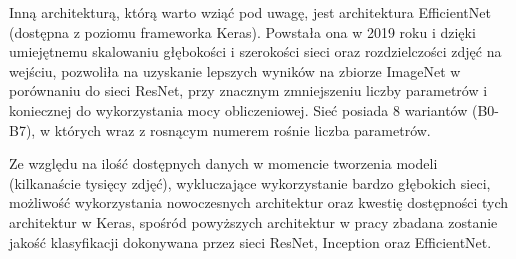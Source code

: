 \documentclass[polish,12pt]{aghthesis}
\begin{document}
\par Inną architekturą, którą warto wziąć pod uwagę, jest architektura EfficientNet (dostępna z poziomu frameworka Keras). Powstała ona w 2019 roku i dzięki umiejętnemu skalowaniu głębokości i szerokości sieci oraz rozdzielczości zdjęć na wejściu, pozwoliła na uzyskanie lepszych wyników na zbiorze ImageNet w porównaniu do sieci ResNet, przy znacznym zmniejszeniu liczby parametrów i koniecznej do wykorzystania mocy obliczeniowej. Sieć posiada 8 wariantów (B0-B7), w których wraz z rosnącym numerem rośnie liczba parametrów.
\par
Ze względu na ilość dostępnych danych w momencie tworzenia modeli (kilkanaście tysięcy zdjęć), wykluczające wykorzystanie bardzo głębokich sieci, możliwość wykorzystania nowoczesnych architektur oraz kwestię dostępności tych architektur w Keras, spośród powyższych architektur w pracy zbadana zostanie jakość klasyfikacji dokonywana przez sieci ResNet, Inception oraz EfficientNet.
\end{document}
